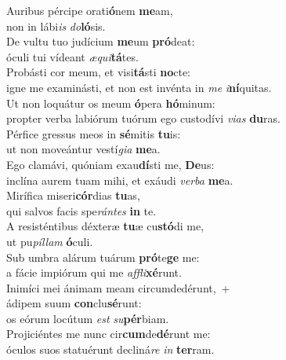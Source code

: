 \evenverse Auribus pércipe orati\textbf{ó}nem \textbf{me}am,~\*\\
\evenverse non in lábi\textit{is} \textit{do}\textbf{ló}sis.\\
\oddverse De vultu tuo judícium \textbf{me}um \textbf{pró}deat:~\*\\
\oddverse óculi tui vídeant \textit{æ}\textit{qui}\textbf{tá}tes.\\
\evenverse Probásti cor meum, et visi\textbf{tá}sti \textbf{no}cte:~\*\\
\evenverse igne me examinásti, et non est invénta in \textit{me} \textit{i}\textbf{ní}quitas.\\
\oddverse Ut non loquátur os meum \textbf{ó}pera \textbf{hó}minum:~\*\\
\oddverse propter verba labiórum tuórum ego custodívi \textit{vi}\textit{as} \textbf{du}ras.\\
\evenverse Pérfice gressus meos in \textbf{sé}mitis \textbf{tu}is:~\*\\
\evenverse ut non moveántur vestí\textit{gi}\textit{a} \textbf{me}a.\\
\oddverse Ego clamávi, quóniam exau\textbf{dí}sti me, \textbf{De}us:~\*\\
\oddverse inclína aurem tuam mihi, et exáudi \textit{ver}\textit{ba} \textbf{me}a.\\
\evenverse Mirífica miseri\textbf{cór}dias \textbf{tu}as,~\*\\
\evenverse qui salvos facis spe\textit{rán}\textit{tes} \textbf{in} te.\\
\oddverse A resisténtibus déxteræ \textbf{tu}æ cu\textbf{stó}di me,~\*\\
\oddverse ut pu\textit{píl}\textit{lam} \textbf{ó}culi.\\
\evenverse Sub umbra alárum tuárum \textbf{pró}te\textbf{ge} me:~\*\\
\evenverse a fácie impiórum qui me \textit{af}\textit{fli}\textbf{xé}runt.\\
\oddverse Inimíci mei ánimam meam circumdedérunt,~+\\
\oddverse  ádipem suum \textbf{con}clu\textbf{sé}runt:~\*\\
\oddverse os eórum locútum \textit{est} \textit{su}\textbf{pér}biam.\\
\evenverse Projiciéntes me nunc cir\textbf{cum}de\textbf{dé}runt me:~\*\\
\evenverse óculos suos statuérunt decliná\textit{re} \textit{in} \textbf{ter}ram.\\
